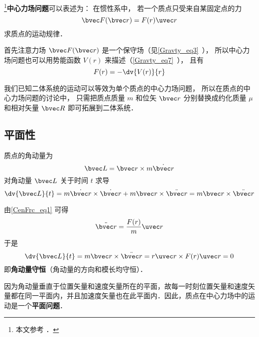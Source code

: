 
\footnote{本文参考 \cite{Goldstein}．}\textbf{中心力场问题}可以表述为： 在惯性系中， 若一个质点只受来自某固定点的力
\begin{equation}\label{CenFrc_eq1}
\bvec F(\bvec r) = F(r) \uvec r
\end{equation}
求质点的运动规律．

首先注意力场 $\bvec F(\bvec r)$ 是一个保守场（见\autoref{Gravty_eq3}~）， 所以中心力场问题也可以用势能函数 $V(r)$ 来描述（\autoref{Gravty_eq7}~）， 且有
\begin{equation}
F(r) = -\dv{V(r)}{r}
\end{equation}

我们已知二体系统的运动可以等效为单个质点的中心力场问题， 所以在质点的中心力场问题的讨论中， 只需把质点质量 $m$ 和位矢 $\bvec r$ 分别替换成约化质量 $\mu$ 和相对矢量 $\bvec R$ 即可拓展到二体系统．

\subsection{平面性}
质点的角动量为
\begin{equation}
\bvec L =\bvec r \times m \dot{\bvec r}
\end{equation}
对角动量 $\bvec L$ 关于时间 $t$ 求导
\begin{equation}
\dv{\bvec L}{t} =m \dot{\bvec r} \times \dot{\bvec r} +m \bvec r \times \ddot{\bvec r}=m \bvec r \times \ddot{\bvec r}
\end{equation}

由\autoref{CenFrc_eq1} 可得
\begin{equation}
\ddot{\bvec r} = \frac{F(r)}{m}\uvec r
\end{equation}
于是
\begin{equation}
\dv{\bvec L}{t} =m \bvec r \times \ddot{\bvec r}= r \uvec r \times F(r)\uvec r=0
\end{equation}
即\textbf{角动量守恒}（角动量的方向和模长均守恒）．

因为角动量垂直于位置矢量和速度矢量所在的平面，故每一时刻位置矢量和速度矢量都在同一平面内，并且加速度矢量也在此平面内．因此，质点在中心力场中的运动是一个\textbf{平面问题}．

